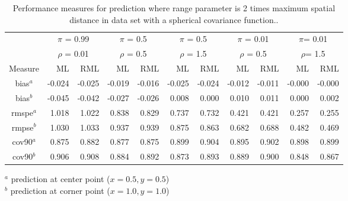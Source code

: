 \documentclass[12pt, titlepage]{article}
\begin{document}

\begin{table}[h]
				\caption{Performance measures for prediction where range parameter is 2 times maximum spatial distance in data set with a spherical covariance function..}
\begin{center}
\begin{tabular}{c|rr|rr|rr|rr|rr}
  \hline
  \hline
  & \multicolumn{2}{|c|}{$\pi$ = 0.99} & \multicolumn{2}{|c|}{$\pi$ = 0.5}  
  & \multicolumn{2}{|c|}{$\pi$ = 0.5} & \multicolumn{2}{|c}{$\pi$ = 0.01} 
  & \multicolumn{2}{|c}{$\pi$= 0.01} \\
  & \multicolumn{2}{|c|}{$\rho$ = 0.01} & \multicolumn{2}{|c|}{$\rho$ = 0.5}  
  & \multicolumn{2}{|c|}{$\rho$ = 1.5} & \multicolumn{2}{|c}{$\rho$ = 0.5} 
  & \multicolumn{2}{|c}{$\rho$= 1.5} \\
  Measure & ML & RML & ML & RML & ML & RML & ML & RML & ML & RML \\
	\hline
  \hline	
	bias$^a$ & -0.024 & -0.025 & -0.019 & -0.016 & -0.025 & -0.024 & -0.012 & -0.011 & -0.000 & -0.000 \\ 
	bias$^b$ &  -0.045 & -0.042 & -0.027 & -0.026 & 0.008 & 0.000 & 0.010 & 0.011 & 0.000 & 0.002 \\ 
	rmspe$^a$ & 1.018 & 1.022 & 0.838 & 0.829 & 0.737 & 0.732 & 0.421 & 0.421 & 0.257 & 0.255 \\ 
	rmpse$^b$ & 1.030 & 1.033 & 0.937 & 0.939 & 0.875 & 0.863 & 0.682 & 0.688 & 0.482 & 0.469 \\ 
	cov90$^a$ & 0.875 & 0.882 & 0.877 & 0.875 & 0.899 & 0.904 & 0.895 & 0.902 & 0.898 & 0.899 \\ 
	cov90$^b$ & 0.906 & 0.908 & 0.884 & 0.892 & 0.873 & 0.893 & 0.889 & 0.900 & 0.848 & 0.867 \\ 
	\hline
  \hline
\end{tabular}
\end{center}
$^a$ prediction at center point ($x = 0.5, y = 0.5$) \\
$^b$ prediction at corner point ($x = 1.0, y = 1.0$)
\end{table}
\end{document}

